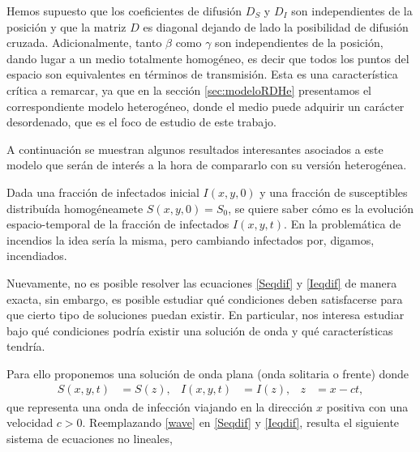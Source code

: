 Hemos supuesto que los coeficientes de difusión $D_{S}$ y $D_{I}$ son independientes de la posición y que la matriz $D$ es diagonal 
dejando de lado la posibilidad de difusión cruzada. Adicionalmente, tanto $\beta$ como $\gamma$ son 
independientes de la posición, dando lugar a un medio totalmente homogéneo, es decir que todos los puntos del espacio son equivalentes en términos de transmisión. Esta 
es una característica crítica a remarcar, ya que en la sección \ref{sec:modeloRDHe} presentamos el correspondiente modelo heterogéneo, donde 
el medio puede adquirir un carácter desordenado, que es el foco de estudio de este trabajo.

A continuación se muestran algunos resultados interesantes asociados a este modelo que serán de interés a la hora de compararlo con su versión heterogénea.


Dada una fracción de infectados inicial $I(x,y,0)$ y una fracción de susceptibles 
distribuída homogéneamete $S(x,y,0)=S_0$, se quiere saber cómo es la evolución espacio-temporal de la fracción de infectados $I(x,y,t)$. En la problemática 
de incendios la idea sería la misma, pero cambiando infectados por, digamos, incendiados. 

Nuevamente, no es posible resolver las ecuaciones \ref{Seqdif} y \ref{Ieqdif} de manera exacta, sin embargo, es posible estudiar qué condiciones deben 
satisfacerse para que cierto tipo de soluciones puedan existir. En particular, nos interesa estudiar bajo qué condiciones podría existir una solución de onda 
y qué características tendría.

Para ello proponemos una solución de onda plana (onda solitaria o frente) donde 
\begin{align}
  S(x,y,t)&=S(z), & I(x,y,t)&=I(z), &  z&=x-ct, \label{wave}
\end{align}
que representa una onda de infección viajando en la dirección $x$ positiva con una velocidad $c>0$. Reemplazando \ref{wave} en \ref{Seqdif} y \ref{Ieqdif}, resulta el 
siguiente sistema de ecuaciones no lineales,

